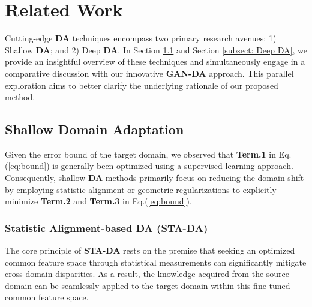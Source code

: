 \section{Related Work}
\label{Related Work}





Cutting-edge \textbf{DA} techniques encompass two primary research avenues: 1) Shallow \textbf{DA}; and 2) Deep \textbf{DA}. In Section \ref{subsect: Shallow DA} and Section \ref{subsect: Deep DA}, we provide an insightful overview of these techniques and simultaneously engage in a comparative discussion with our innovative \textbf{GAN-DA} approach. This parallel exploration aims to better clarify the underlying rationale of our proposed method.




\subsection{Shallow Domain Adaptation}
\label{subsect: Shallow DA}



Given the error bound of the target domain, we observed that \textbf{Term.1} in Eq.(\ref{eq:bound}) is generally been optimized using a supervised learning approach. Consequently, shallow \textbf{DA} methods primarily focus on reducing the domain shift by employing statistic alignment or geometric regularizations to explicitly minimize \textbf{Term.2} and \textbf{Term.3} in Eq.(\ref{eq:bound}).








\subsubsection{Statistic Alignment-based DA \textbf{(STA-DA)}} 
\label{Statistic alignment-based DA}


The core principle of \textbf{STA-DA} rests on the premise that seeking an optimized common feature space through statistical measurements can significantly mitigate cross-domain disparities. As a result, the knowledge acquired from the source domain can be seamlessly applied to the target domain within this fine-tuned common feature space.



